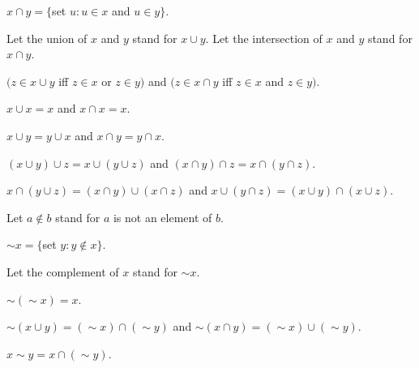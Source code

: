 \documentclass[a4paper,draft]{amsproc}
\begin{document}
\begin{forthel}
\begin{definition} 
$x \cap y = \{$set $u : u \in x$ and $u \in y \}$.
\end{definition}

Let the union of $x$ and $y$ stand for $x \cup y$.
Let the intersection of $x$ and $y$ stand for $x \cap y$.

\begin{theorem}
$(z \in x \cup y$ iff $z \in x$ or $z \in y)$
and $(z \in x \cap y$ iff $z \in x$ and $z \in y)$.
\end{theorem}

\begin{theorem}
$x \cup x = x$ and $x \cap x = x$.
\end{theorem}

\begin{theorem}
$x \cup y = y \cup x$ and $x \cap y = y \cap x$.
\end{theorem}

\begin{theorem}
$(x \cup y) \cup z = x \cup (y \cup z)$ 
and $(x \cap y) \cap z = x \cap (y \cap z)$.
\end{theorem}

\begin{theorem}
$x \cap (y \cup z) = (x \cap y) \cup (x \cap z)$
and $x \cup (y \cap z) = (x \cup y) \cap (x \cup z)$.
\end{theorem}

Let $a \notin b$ stand for $a$ is not an element of $b$.

\begin{definition} $\sim x = \{$set $y : y \notin x\}$.\end{definition}
Let the complement of $x$ stand for $\sim x$.

\begin{theorem}
$\sim (\sim x) = x$.
\end{theorem}

\begin{theorem}
$\sim (x \cup y) = (\sim x) \cap (\sim y)$ 
and $\sim (x \cap y) = (\sim x) \cup (\sim y)$.
\end{theorem}

\begin{definition} $x \sim y = x \cap (\sim y)$.\end{definition}


\end{forthel}
\end{document}
